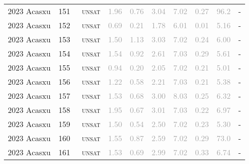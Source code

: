 \begin{center}
{\begin{longtable}{@{}llllllllll@{}}
2023 Acasxu & 151 & ~\textsc{unsat} & \textcolor{darkgray}{1.96} & \textcolor{darkgray}{0.76} & \textcolor{darkgray}{3.04} & \textcolor{darkgray}{7.02} & \textcolor{darkgray}{0.27} & \textcolor{darkgray}{96.2} & - \\
2023 Acasxu & 152 & ~\textsc{unsat} & \textcolor{darkgray}{0.69} & \textcolor{darkgray}{0.21} & \textcolor{darkgray}{1.78} & \textcolor{darkgray}{6.01} & \textcolor{darkgray}{0.01} & \textcolor{darkgray}{5.16} & - \\
2023 Acasxu & 153 & ~\textsc{unsat} & \textcolor{darkgray}{1.50} & \textcolor{darkgray}{1.13} & \textcolor{darkgray}{3.03} & \textcolor{darkgray}{7.02} & \textcolor{darkgray}{0.24} & \textcolor{darkgray}{6.00} & - \\
2023 Acasxu & 154 & ~\textsc{unsat} & \textcolor{darkgray}{1.54} & \textcolor{darkgray}{0.92} & \textcolor{darkgray}{2.61} & \textcolor{darkgray}{7.03} & \textcolor{darkgray}{0.29} & \textcolor{darkgray}{5.61} & - \\
2023 Acasxu & 155 & ~\textsc{unsat} & \textcolor{darkgray}{0.94} & \textcolor{darkgray}{0.20} & \textcolor{darkgray}{2.05} & \textcolor{darkgray}{7.02} & \textcolor{darkgray}{0.21} & \textcolor{darkgray}{5.01} & - \\
2023 Acasxu & 156 & ~\textsc{unsat} & \textcolor{darkgray}{1.22} & \textcolor{darkgray}{0.58} & \textcolor{darkgray}{2.21} & \textcolor{darkgray}{7.03} & \textcolor{darkgray}{0.21} & \textcolor{darkgray}{5.38} & - \\
2023 Acasxu & 157 & ~\textsc{unsat} & \textcolor{darkgray}{1.53} & \textcolor{darkgray}{0.68} & \textcolor{darkgray}{3.00} & \textcolor{darkgray}{8.03} & \textcolor{darkgray}{0.25} & \textcolor{darkgray}{6.32} & - \\
2023 Acasxu & 158 & ~\textsc{unsat} & \textcolor{darkgray}{1.95} & \textcolor{darkgray}{0.67} & \textcolor{darkgray}{3.01} & \textcolor{darkgray}{7.03} & \textcolor{darkgray}{0.22} & \textcolor{darkgray}{6.97} & - \\
2023 Acasxu & 159 & ~\textsc{unsat} & \textcolor{darkgray}{1.50} & \textcolor{darkgray}{0.54} & \textcolor{darkgray}{2.50} & \textcolor{darkgray}{7.02} & \textcolor{darkgray}{0.23} & \textcolor{darkgray}{5.30} & - \\
2023 Acasxu & 160 & ~\textsc{unsat} & \textcolor{darkgray}{1.55} & \textcolor{darkgray}{0.87} & \textcolor{darkgray}{2.59} & \textcolor{darkgray}{7.02} & \textcolor{darkgray}{0.29} & \textcolor{darkgray}{73.0} & - \\
2023 Acasxu & 161 & ~\textsc{unsat} & \textcolor{darkgray}{1.53} & \textcolor{darkgray}{0.69} & \textcolor{darkgray}{2.99} & \textcolor{darkgray}{7.02} & \textcolor{darkgray}{0.33} & \textcolor{darkgray}{6.74} & - \\

\end{longtable}}
\end{center}
